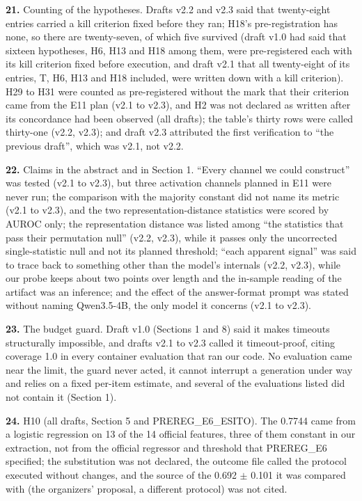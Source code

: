 \noindent\textbf{21.} Counting of the hypotheses. Drafts v2.2 and v2.3 said that twenty-eight entries carried a kill criterion fixed before they ran; H18's pre-registration has none, so there are twenty-seven, of which five survived (draft v1.0 had said that sixteen hypotheses, H6, H13 and H18 among them, were pre-registered each with its kill criterion fixed before execution, and draft v2.1 that all twenty-eight of its entries, T, H6, H13 and H18 included, were written down with a kill criterion). H29 to H31 were counted as pre-registered without the mark that their criterion came from the E11 plan (v2.1 to v2.3), and H2 was not declared as written after its concordance had been observed (all drafts); the table's thirty rows were called thirty-one (v2.2, v2.3); and draft v2.3 attributed the first verification to ``the previous draft'', which was v2.1, not v2.2.
\par

\noindent\textbf{22.} Claims in the abstract and in Section 1. ``Every channel we could construct'' was tested (v2.1 to v2.3), but three activation channels planned in E11 were never run; the comparison with the majority constant did not name its metric (v2.1 to v2.3), and the two representation-distance statistics were scored by AUROC only; the representation distance was listed among ``the statistics that pass their permutation null'' (v2.2, v2.3), while it passes only the uncorrected single-statistic null and not its planned threshold; ``each apparent signal'' was said to trace back to something other than the model's internals (v2.2, v2.3), while our probe keeps about two points over length and the in-sample reading of the artifact was an inference; and the effect of the answer-format prompt was stated without naming Qwen3.5-4B, the only model it concerns (v2.1 to v2.3).
\par

\noindent\textbf{23.} The budget guard. Draft v1.0 (Sections 1 and 8) said it makes timeouts structurally impossible, and drafts v2.1 to v2.3 called it timeout-proof, citing coverage 1.0 in every container evaluation that ran our code. No evaluation came near the limit, the guard never acted, it cannot interrupt a generation under way and relies on a fixed per-item estimate, and several of the evaluations listed did not contain it (Section 1).
\par

\noindent\textbf{24.} H10 (all drafts, Section 5 and PREREG\_E6\_ESITO). The 0.7744 came from a logistic regression on 13 of the 14 official features, three of them constant in our extraction, not from the official regressor and threshold that PREREG\_E6 specified; the substitution was not declared, the outcome file called the protocol executed without changes, and the source of the 0.692 $\pm$ 0.101 it was compared with (the organizers' proposal, a different protocol) was not cited.
\par

